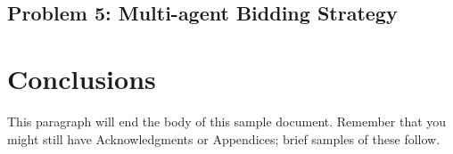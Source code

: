 \documentclass{sig-alternate-05-2015}
\begin{document}
\subsection{Problem 5: Multi-agent Bidding Strategy}

\section{Conclusions}
This paragraph will end the body of this sample document.
Remember that you might still have Acknowledgments or
Appendices; brief samples of these
follow.








%
\end{document}
